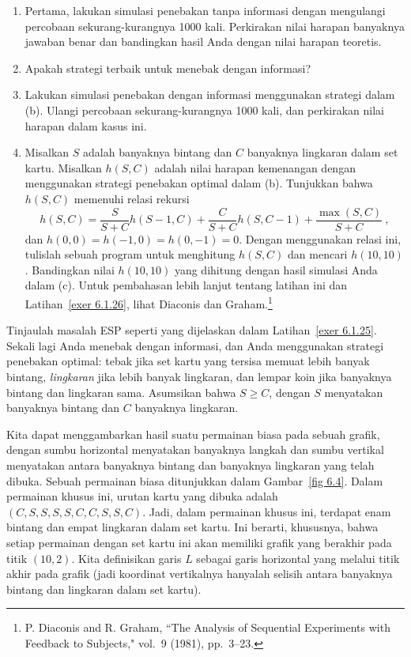 \begin{LJSItem}
\begin{enumerate}
\item Pertama, lakukan simulasi penebakan tanpa informasi dengan mengulangi
percobaan sekurang-kurangnya 1000 kali. Perkirakan nilai harapan banyaknya jawaban benar dan
bandingkan hasil Anda dengan nilai harapan teoretis.

\item Apakah strategi terbaik untuk menebak dengan informasi?

\item Lakukan simulasi penebakan dengan informasi menggunakan strategi dalam (b).
Ulangi percobaan sekurang-kurangnya 1000 kali, dan perkirakan nilai harapan dalam kasus ini.

\item Misalkan $S$ adalah banyaknya bintang dan $C$ banyaknya lingkaran dalam set kartu. Misalkan
$h(S,C)$ adalah nilai harapan kemenangan dengan menggunakan strategi penebakan optimal dalam (b). Tunjukkan
bahwa $h(S,C)$ memenuhi relasi rekursi
$$ h(S,C) = \frac S{S + C} h(S - 1,C) + \frac C{S + C} h(S,C - 1) + \frac
{\max(S,C)}{S + C}\ ,
$$ dan $h(0,0) = h(-1,0) = h(0,-1) = 0$. Dengan menggunakan relasi ini, tulislah sebuah program untuk
menghitung $h(S,C)$ dan mencari $h(10,10)$. Bandingkan nilai $h(10,10)$ yang dihitung dengan
hasil simulasi Anda dalam (c). Untuk pembahasan lebih lanjut tentang latihan ini dan
Latihan~\ref{exer 6.1.26}, lihat Diaconis dan Graham.\footnote{P. Diaconis and R. Graham, ``The Analysis of Sequential Experiments with Feedback to
Subjects,"  vol.~9 (1981), pp.~3--23.}
\end{enumerate}

\istar\label{exer 6.1.26} Tinjaulah masalah ESP seperti yang dijelaskan dalam Latihan~\ref{exer
6.1.25}. Sekali lagi Anda menebak dengan informasi, dan Anda menggunakan strategi
penebakan optimal: tebak  jika set kartu yang tersisa memuat lebih banyak bintang, {\em
lingkaran} jika lebih banyak lingkaran, dan lempar koin jika banyaknya bintang dan lingkaran
sama. Asumsikan bahwa $S \geq C$, dengan $S$ menyatakan banyaknya bintang dan $C$ banyaknya
lingkaran.
\par Kita dapat menggambarkan hasil suatu permainan biasa pada sebuah grafik, dengan sumbu horizontal
menyatakan banyaknya langkah dan sumbu vertikal menyatakan 
antara banyaknya bintang dan banyaknya lingkaran yang telah dibuka. Sebuah
permainan biasa ditunjukkan dalam Gambar~\ref{fig 6.4}. Dalam permainan khusus ini, urutan
kartu yang dibuka adalah $(C,S,S,S,S,C,C,S,S,C)$. Jadi, dalam permainan khusus
ini, terdapat enam bintang dan empat lingkaran dalam set kartu. Ini berarti, khususnya,
bahwa setiap permainan dengan set kartu ini akan memiliki grafik yang berakhir pada titik
$(10, 2)$. Kita definisikan garis $L$ sebagai garis horizontal yang melalui
titik akhir pada grafik (jadi koordinat vertikalnya hanyalah selisih antara
banyaknya bintang dan lingkaran dalam set kartu).


\end{LJSItem}
